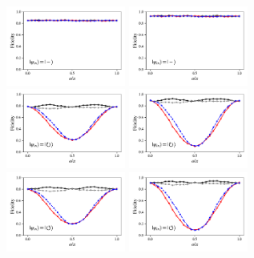 \documentclass[a4paper]{article}
\begin{document}
\begin{figure}[H]
	\\
	\includegraphics[width=0.35\textwidth]{fidelity_qc0_mit1_state3}
	\includegraphics[width=0.35\textwidth]{fidelity_qc0_mit0_state3}
	\\
	\includegraphics[width=0.35\textwidth]{fidelity_qc0_mit1_state4}
	\includegraphics[width=0.35\textwidth]{fidelity_qc0_mit0_state4}
	\\
	\includegraphics[width=0.35\textwidth]{fidelity_qc0_mit1_state5}
	\includegraphics[width=0.35\textwidth]{fidelity_qc0_mit0_state5}
\end{figure}
\end{document}
